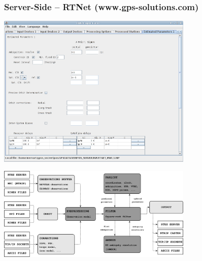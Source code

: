 \documentclass[10pt]{beamer}
\begin{document}

\begin{frame}
\frametitle{Server-Side -- RTNet (www.gps-solutions.com)}
\includegraphics[width=0.7\textwidth,angle=0]{rtnet_menu.png}

\vspace*{-3cm}
\hspace*{4cm}
\includegraphics[width=0.7\textwidth,angle=0]{rtnet_schema.png}
\end{frame}

\end{document}
